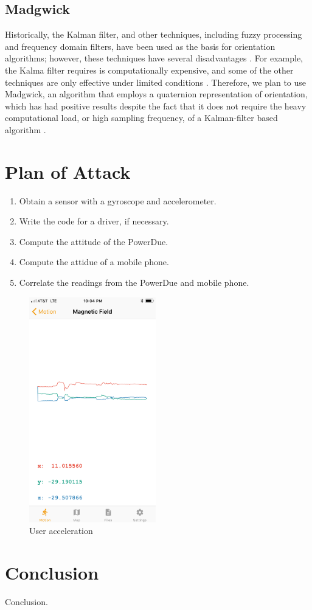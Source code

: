 \documentclass[journal]{IEEEtranTIE}
\begin{document}
\subsection{Madgwick}

Historically, the Kalman filter, and other techniques, including fuzzy
processing and frequency domain filters, have been used as the basis for
orientation algorithms; however, these techniques have several disadvantages
\cite{Madgwick}. For example, the Kalma filter requires is computationally
expensive, and some of the other techniques are only effective under limited
conditions \cite{Madgwick}. Therefore, we plan to use Madgwick, an algorithm
that employs a quaternion representation of orientation, which has had positive
results despite the fact that it does not require the heavy computational load,
or high sampling frequency, of a Kalman-filter based algorithm \cite{Madgwick}.

\section{Plan of Attack}

\begin{enumerate}
\item Obtain a sensor with a gyroscope and accelerometer.
\item Write the code for a driver, if necessary.
\item Compute the attitude of the PowerDue.
\item Compute the attidue of a mobile phone.
\item Correlate the readings from the PowerDue and mobile phone.
\end{enumerate}

\begin{figure}[!t]\centering
	\includegraphics[width=5.5cm]{magnetic_field}
	\caption{User acceleration}\label{fig3}
\end{figure}

\section{Conclusion}

Conclusion.



\ %
\end{document}
